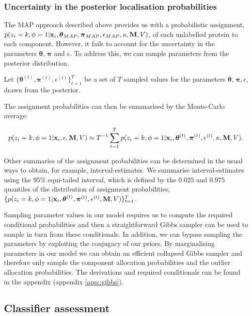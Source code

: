\documentclass[12pt,english]{article}\usepackage[]{graphicx}\usepackage[]{color}
\begin{document}
\subsubsection*{Uncertainty in the posterior localisation probabilities}\label{section::MCMC}

The MAP approach described above provides us with a probabilistic
assignment,
$p(z_i = k, \phi = 1 | {\bf x}_i, \boldsymbol{\theta}_{MAP},
\boldsymbol{\pi}_{MAP} , \epsilon_{MAP},\kappa, {\bf M}, V)$, of each
unlabelled protein to each component.  However, it fails to account
for the uncertainty in the parameters $\boldsymbol{\theta}$,
$\boldsymbol{\pi}$ and $\epsilon$. To address this, we can sample
parameters from the posterior distribution.

Let
$\{\boldsymbol{\theta}^{(t)}, \boldsymbol{\pi}^{(t)},
\epsilon^{(t)}\}_{t=1}^T$ be a set of $T$ sampled values for the
parameters $\boldsymbol{\theta}$, $\boldsymbol{\pi}, \epsilon$, drawn
from the posterior.


The assignment probabilities can then be summarised by the Monte-Carlo
average:

\[p(z_i = k, \phi = 1 | {\bf x}_i, \epsilon, {\bf M}, V) \approx T^{-1}\sum_{t=1}^{T}p(z_i = k, \phi = 1 | {\bf x}_i, \boldsymbol{\theta}^{(t)}, \boldsymbol{\pi}^{(t)} , \epsilon^{(t)}, \kappa, {\bf M}, V).\]

Other summaries of the assignment probabilities can be determined in
the usual ways to obtain, for example, interval-estimates. We
summarise interval-estimates using the $95\%$ equi-tailed interval,
which is defined by the $0.025$ and $0.975$ quantiles of the
distribution of assignment probabilities,
$\{p(z_i = k, \phi = 1 | {\bf x}_i, \boldsymbol{\theta}^{(t)},
\boldsymbol{\pi}^{(t)} , \epsilon^{(t)}, {\bf M}, V) \}_{t=1}^T$.

Sampling parameter values in our model requires us to compute the
required conditional probabilities and then a straightforward Gibbs
sampler can be used to sample in turn from these conditionals. In
addition, we can bypass sampling the parameters by exploiting the
conjugacy of our priors. By marginalising parameters in our model we
can obtain an efficient collapsed Gibbs sampler and therefore only
sample the component allocation probabilities and the outlier
allocation probabilities. The derivations and required conditionals
can be found in the appendix (appendix \ref{app::gibbs}).

\subsection*{Classifier assessment}\label{section::assessment}
\end{document}
